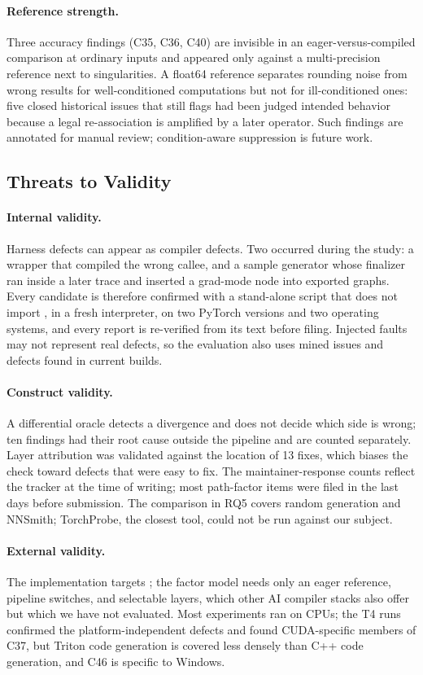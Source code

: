 \paragraph{Reference strength.} Three accuracy findings (C35, C36, C40) are invisible in an
eager-versus-compiled comparison at ordinary inputs and appeared only against a multi-precision reference next to
singularities. A float64 reference separates rounding noise from wrong results for
well-conditioned computations but not for ill-conditioned ones: five closed historical issues that \tool still
flags had been judged intended behavior because a legal re-association is amplified by a later operator.
Such findings are annotated for manual review; condition-aware suppression is future work.

\subsection{Threats to Validity}
\label{sec:threats}

\paragraph{Internal validity.} Harness defects can appear as compiler defects. Two occurred during the study: a
wrapper that compiled the wrong callee, and a sample generator whose  finalizer ran inside a
later trace and inserted a grad-mode node into exported graphs. Every candidate is therefore confirmed with a stand-alone script that does not
import \tool, in a fresh interpreter, on two PyTorch versions and two operating systems, and every report is
re-verified from its text before filing. Injected faults may not represent real defects, so the evaluation
also uses mined issues and defects found in current builds.

\paragraph{Construct validity.} A differential oracle detects a divergence and does not decide which side is wrong; ten findings had their root cause outside the pipeline and are counted
separately. Layer attribution was validated against the location of 13 fixes, which biases the check
toward defects that were easy to fix. The maintainer-response counts reflect the tracker at the time of writing;
most path-factor items were filed in the last days before submission. The comparison in RQ5 covers random
generation and NNSmith; TorchProbe, the closest tool, could not be run against our subject.

\paragraph{External validity.} The implementation targets \tcompile; the factor model needs only an eager
reference, pipeline switches, and selectable layers, which other AI compiler stacks also offer but which we have
not evaluated. Most experiments ran on CPUs; the T4 runs confirmed the platform-independent
defects and found CUDA-specific members of C37, but Triton code generation is covered less densely than C++
code generation, and C46 is specific to Windows.
\clearpage
